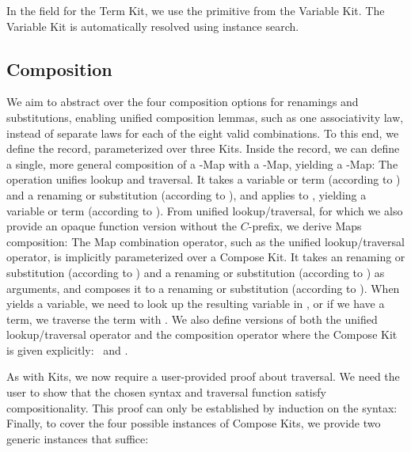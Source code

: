 \documentclass[screen,nonacm]{acmart}
\begin{document}
\noindent\begin{minipage}[t]{0.48\linewidth}
      \raggedright{}
      \AInstanceRen{}
\end{minipage}
\begin{minipage}[t]{0.48\linewidth}
      \raggedright{}
      \AInstanceSub{}
\end{minipage}

\noindent In the  field for the Term Kit, we use the  primitive from the
Variable Kit. The Variable Kit is automatically resolved using
instance search.

\subsection{Composition}\label{sec:ags-com}
We aim to abstract over the four composition options for renamings and
substitutions, enabling unified composition lemmas, such as one associativity
law, instead of separate laws for each of the eight valid combinations. To this
end, we define the  record, parameterized over three
Kits. Inside the record, we can define a single, more general composition of a
-Map with a -Map, yielding a -Map:
\AComposeKit{}The operation  unifies lookup and
traversal. It takes a variable or term  (according to
) and a renaming or substitution  (according to
), and applies  to , yielding a
variable or term (according to ). From unified
lookup/traversal, for which we also provide an opaque function version without
the $C$-prefix, we derive Maps composition: \ACompDef{}The Map combination
operator, such as the unified lookup/traversal operator, is implicitly
parameterized over a Compose Kit. It takes an renaming or substitution
 (according to ) and a renaming or substitution
 (according to ) as arguments, and composes it to a
renaming or substitution (according to ). When 
\AgdaFunction{\&}  yields a variable, we need to look up the
resulting variable in , or if we have a term, we traverse the
term with . We also define versions of both the unified
lookup/traversal operator and the composition operator where the Compose Kit is
given explicitly: \ACompExp\ and \ALoAExp.

As with Kits, we now require a user-provided proof about traversal. We need the
user to show that the chosen syntax and traversal function satisfy
compositionality. This proof can only be established by induction on the
syntax: \ACompositionality{}Finally, to cover the four possible instances of
Compose Kits, we provide two generic instances that suffice:
\end{document}
